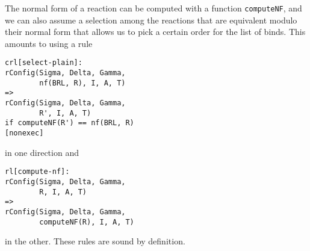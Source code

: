 \documentclass{article}
\begin{document}
The normal form of a reaction can be computed with a function \verb+computeNF+, and we can also
assume a selection among the reactions that are equivalent modulo their normal
form that allows us to pick a certain order for the list of binds.
This amounts to using a rule
\begin{lstlisting}
crl[select-plain]:
rConfig(Sigma, Delta, Gamma,
        nf(BRL, R), I, A, T)
=> 
rConfig(Sigma, Delta, Gamma,
        R', I, A, T)        
if computeNF(R') == nf(BRL, R)
[nonexec]        
\end{lstlisting}
\noindent in one direction and 
\begin{lstlisting}
rl[compute-nf]:
rConfig(Sigma, Delta, Gamma,
        R, I, A, T)
=> 
rConfig(Sigma, Delta, Gamma,
        computeNF(R), I, A, T)        
\end{lstlisting}
\noindent in the other. These rules are sound by definition.
\end{document}
